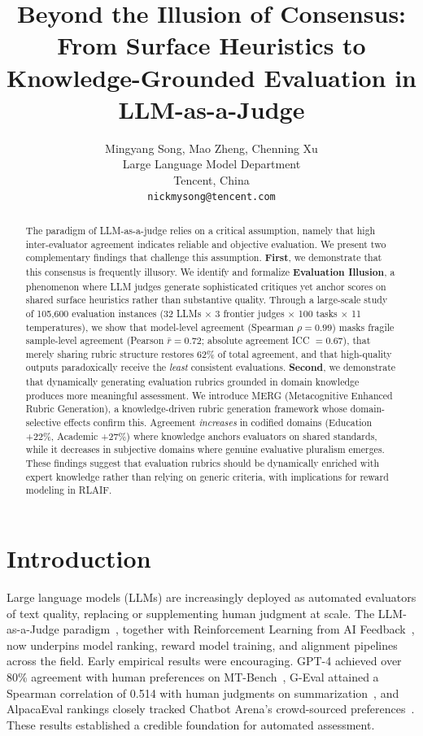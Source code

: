 \documentclass{article}
\title{Beyond the Illusion of Consensus: From Surface Heuristics to Knowledge-Grounded Evaluation in LLM-as-a-Judge}
\author{Mingyang Song, Mao Zheng, Chenning Xu\\
Large Language Model Department\\
Tencent, China\\
\texttt{nickmysong@tencent.com}}
\begin{document}
\ifcolmsubmission
\linenumbers
\fi

\maketitle

\begin{abstract}
The paradigm of LLM-as-a-judge relies on a critical assumption, namely that high inter-evaluator agreement indicates reliable and objective evaluation. We present two complementary findings that challenge this assumption. \textbf{First}, we demonstrate that this consensus is frequently illusory. We identify and formalize \textbf{Evaluation Illusion}, a phenomenon where LLM judges generate sophisticated critiques yet anchor scores on shared surface heuristics rather than substantive quality. Through a large-scale study of 105,600 evaluation instances (32 LLMs $\times$ 3 frontier judges $\times$ 100 tasks $\times$ 11 temperatures), we show that model-level agreement (Spearman $\rho = 0.99$) masks fragile sample-level agreement (Pearson $\bar{r} = 0.72$; absolute agreement ICC $= 0.67$), that merely sharing rubric structure restores 62\% of total agreement, and that high-quality outputs paradoxically receive the \textit{least} consistent evaluations. \textbf{Second}, we demonstrate that dynamically generating evaluation rubrics grounded in domain knowledge produces more meaningful assessment. We introduce MERG (Metacognitive Enhanced Rubric Generation), a knowledge-driven rubric generation framework whose domain-selective effects confirm this. Agreement \textit{increases} in codified domains (Education +22\%, Academic +27\%) where knowledge anchors evaluators on shared standards, while it decreases in subjective domains where genuine evaluative pluralism emerges. These findings suggest that evaluation rubrics should be dynamically enriched with expert knowledge rather than relying on generic criteria, with implications for reward modeling in RLAIF.
\end{abstract}

\section{Introduction}

Large language models (LLMs) are increasingly deployed as automated evaluators of text quality, replacing or supplementing human judgment at scale. The LLM-as-a-Judge paradigm~\citep{zheng2023judging, chiang2024chatbot}, together with Reinforcement Learning from AI Feedback~\citep[RLAIF;][]{lee2023rlaif}, now underpins model ranking, reward model training, and alignment pipelines across the field. Early empirical results were encouraging. GPT-4 achieved over 80\% agreement with human preferences on MT-Bench~\citep{zheng2023judging}, G-Eval attained a Spearman correlation of 0.514 with human judgments on summarization~\citep{liu2023geval}, and AlpacaEval rankings closely tracked Chatbot Arena's crowd-sourced preferences~\citep{li2023alpacaeval, chiang2024chatbot}. These results established a credible foundation for automated assessment.
\end{document}
